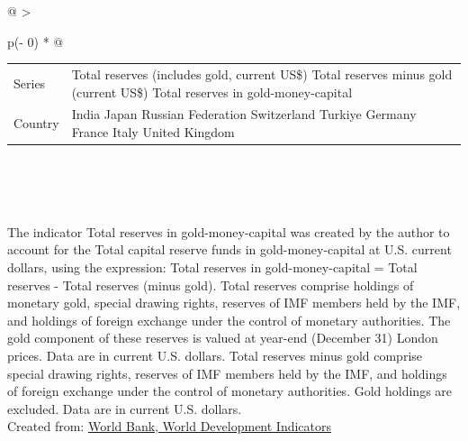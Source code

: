 \documentclass[
]{article}
\newenvironment{LTR}{\beginL}{\endL}
\begin{document}
\begin{longtable}[]{@{}
  >{\raggedright\arraybackslash}p{(\columnwidth - 0\tabcolsep) * }@{}}
\toprule\noalign{}
\endhead
\bottomrule\noalign{}
\endlastfoot
\begin{minipage}[t]{\linewidth}\raggedright
\hypertarget{REPORT_PREVIEW_divdropdown}{}
\begin{longtable}[]{@{}ll@{}}
\toprule\noalign{}
\endhead
\bottomrule\noalign{}
\endlastfoot
\protect\hypertarget{REPORT_PREVIEW_lblPage_1}{}{Series} & Total
reserves (includes gold, current US\$) Total reserves minus gold
(current US\$) Total reserves in gold-money-capital
\protect\hypertarget{REPORT_PREVIEW_meta_link_page_WDI_Series}{}{{{}}} \\
\protect\hypertarget{REPORT_PREVIEW_lblComp_3}{}{Country} & India Japan
Russian Federation Switzerland Turkiye Germany France Italy United
Kingdom
\protect\hypertarget{REPORT_PREVIEW_meta_link_comp_WDI_Ctry}{}{{{}}} \\
\end{longtable}
\end{minipage} \\
 \\
\begin{minipage}[t]{\linewidth}\raggedright
\hypertarget{container}{}
\begin{LTR}
\end{LTR}
\end{minipage} \\
\protect\hypertarget{REPORT_PREVIEW_lblXAxis}{}{}
\protect\hypertarget{REPORT_PREVIEW_lblFooter}{}{The indicator Total
reserves in gold-money-capital was created by the author to account for
the Total capital reserve funds in gold-money-capital at U.S. current
dollars, using the expression: Total reserves in gold-money-capital =
Total reserves - Total reserves (minus gold). Total reserves comprise
holdings of monetary gold, special drawing rights, reserves of IMF
members held by the IMF, and holdings of foreign exchange under the
control of monetary authorities. The gold component of these reserves is
valued at year-end (December 31) London prices. Data are in current U.S.
dollars. Total reserves minus gold comprise special drawing rights,
reserves of IMF members held by the IMF, and holdings of foreign
exchange under the control of monetary authorities. Gold holdings are
excluded. Data are in current U.S. dollars.} \\
\protect\hypertarget{REPORT_PREVIEW_sReportSource}{}{Created from:}
\protect\hypertarget{REPORT_PREVIEW_hplDatabaseName}{\href{javascript:Shared(\textquotesingle{}/Total-reserves-in-gold-money-capital-(U.S.-current-dollars)-1960-2023-China-U.S.-comparison/id/fff32cbe\textquotesingle{});}{World
Bank, World Development Indicators}} \\
\textbf{} \protect\hypertarget{REPORT_PREVIEW_sDisclaimerMsg}{}{ } \\
\end{longtable}
\end{document}
